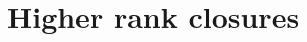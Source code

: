 \documentclass[11pt]{article}
\newcommand{\eps}{\varepsilon}
\newcommand{\lars}[1]{{\color{magenta}Lars: {#1} }}
\theoremstyle{remark}
\begin{document}
\section{Higher rank closures}
%
\end{document}
